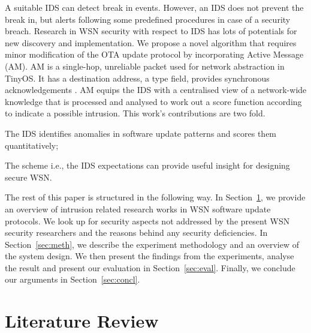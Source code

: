 \documentclass[conference,final]{IEEEtran}
\begin{document}
A suitable IDS can detect  break in events. 
However, an IDS does not prevent the break in, but alerts following some predefined procedures in case of a security breach.
Research in WSN security with respect to IDS has lots of potentials for new discovery and implementation. 
We propose a novel algorithm that requires minor modification of the OTA update protocol by incorporating Active Message (AM). 
AM is a single-hop, unreliable packet used for network abstraction in TinyOS. 
It has a destination address, a type field, provides synchronous acknowledgements \cite{tep116}. 
AM equips the IDS with a centralised view of a network-wide knowledge that is processed and analysed to work out a score function according to indicate a possible intrusion.
This work's contributions are two fold.
\begin{inparaenum}
\item  The IDS identifies anomalies in software update patterns and scores them quantitatively;
\item The scheme i.e., the IDS expectations can provide useful insight for designing secure WSN.
\end{inparaenum}

The rest of this paper is structured in the following way. In
Section~\ref{sec:lit}, we provide an overview of intrusion related research works in WSN software update protocols. 
We look up for  security aspects not addressed by the present WSN security researchers and the reasons behind any security deficiencies. 
In Section~\ref{sec:meth}, we describe the experiment methodology and an overview of the system  design. 
We then present the findings from the experiments, analyse the result and present our evaluation in Section~\ref{sec:eval}.  
Finally, we conclude our arguments in Section~\ref{sec:concl}.




\section{Literature Review}
\label{sec:lit}
\end{document}
